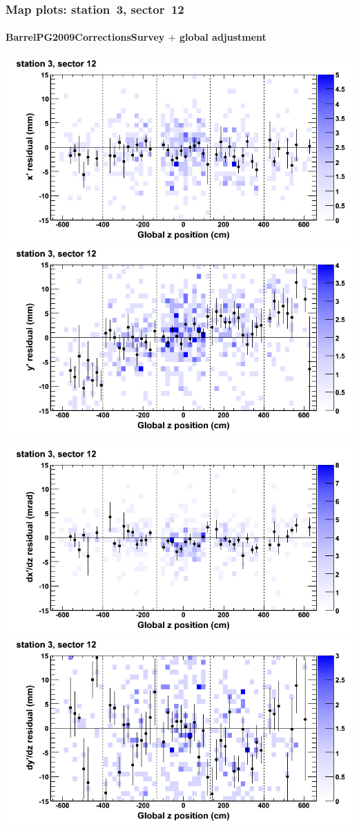 \documentclass[compress]{beamer}
\begin{document}
\begin{frame}
\frametitle{Map plots: station~3, sector~12}
\framesubtitle{BarrelPG2009CorrectionsSurvey $+$ global adjustment}
\includegraphics[width=0.5\linewidth]{mapplots_re01/DTvsz_st3sec12_x.png}
\includegraphics[width=0.5\linewidth]{mapplots_re01/DTvsz_st3sec12_y.png}

\includegraphics[width=0.5\linewidth]{mapplots_re01/DTvsz_st3sec12_dxdz.png}
\includegraphics[width=0.5\linewidth]{mapplots_re01/DTvsz_st3sec12_dydz.png}
\end{frame}
\end{document}
